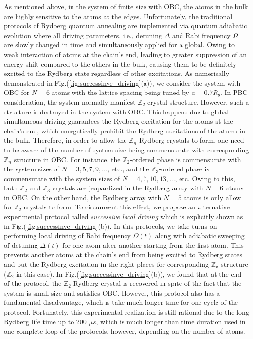 \documentclass[%
 reprint,
nofootinbib,
 amsmath,amssymb,
 aps,
pra,
floatfix,
]{revtex4-2}
\begin{document}
As mentioned above, in the system of finite size with OBC, the atoms in the bulk are highly sensitive to the atoms at the edges. Unfortunately, the traditional protocols of Rydberg quantum annealing are implemented via quantum adiabatic evolution where all driving parameters, i.e., detuning $\Delta$ and Rabi frequency $\Omega$ are slowly changed in time and simultaneously applied for a global. Owing to weak interaction of atoms at the chain's end, leading to greater suppression of an energy shift compared to the others in the bulk, causing them to be definitely excited to the Rydberg state regardless of other excitations. As numerically demonstrated in Fig.(\ref{fig:successinve_driving}(a)), we consider the system with OBC for $N=6$ atoms with the lattice spacing being tuned by $a = 0.7R_b$. In PBC consideration, the system normally manifest $\mathbb{Z}_2$ crystal structure. However, such a structure is destroyed in the system with OBC. This happens due to global simultaneous driving guarantees the Rydberg excitation for the atoms at the chain's end, which energetically prohibit the Rydberg excitations of the atoms in the bulk. Therefore, in order to allow the $\mathbb{Z}_n$ Rydberg crystals to form, one need to be aware of the number of system size being commensurate with corresponding $\mathbb{Z}_n$ structure in OBC. For instance, the $\mathbb{Z}_2$-ordered phase is commensurate with the system sizes of $N=3,5,7,9,...$, etc., and the $\mathbb{Z}_3$-ordered phase is commensurate with the system sizes of $N=4,7,10,13,...$,  etc. Owing to this, both $\mathbb{Z}_2$ and $\mathbb{Z}_3$ crystals are jeopardized in the Rydberg array with $N=6$ atoms in OBC. On the other hand, the Rydberg array with $N=5$ atoms is only allow for $\mathbb{Z}_2$ crystals to form. To circumvent this effect, we propose an alternative experimental protocol called \emph{successive local driving} which is explicitly shown as in Fig.(\ref{fig:successinve_driving}(b)). In this protocols, we take turns on performing local driving of Rabi frequency $\Omega(t)$ along with adiabatic sweeping of detuning $\Delta(t)$ for one atom after another starting from the first atom. This prevents another atoms at the chain's end from being excited to Rydberg states and put the Rydberg excitation in the right places for corresponding $\mathbb{Z}_n$ structure ($\mathbb{Z}_2$ in this case). In Fig.(\ref{fig:successinve_driving}(b)), we found that at the end of the protocol, the $\mathbb{Z}_2$ Rydberg crystal is recovered in spite of the fact that the system is small size and satisfies OBC. However, this protocol also has a fundamental disadvantage, which is take much longer time for one cycle of the protocol. Fortunately, this experimental realization is still rational due to the long Rydberg life time up to 200 $\mu s$, which is much longer than time duration used in one complete loop of the protocols, however, depending on the number of atoms.  
\end{document}
